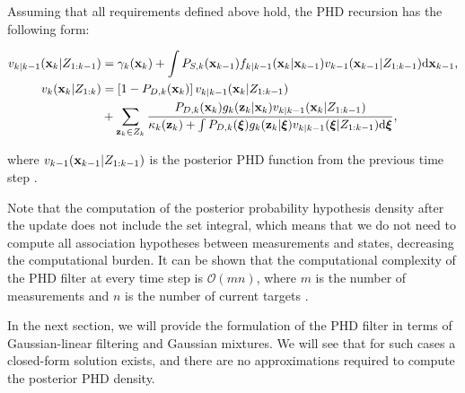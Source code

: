 \begin{theorem}\label{theorem:phd-recursion}
    Assuming that all requirements defined above hold, the PHD recursion has the following form:

    \begin{align}
        v_{k|k-1}(\vecat{x}{k} | Z_{1:k-1})
        &= \gamma_k(\vecat{x}{k}) + \int P_{S,k}(\vecat{x}{k-1}) f_{k|k-1}(\vecat{x}{k} | \vecat{x}{k-1}) v_{k-1}(\vecat{x}{k-1} | Z_{1:k-1}) \mathrm{d} \vecat{x}{k-1}, \\
        v_k(\vecat{x}{k} | Z_{1:k})
        &= \left[1-P_{D,k}(\vecat{x}{k})\right] v_{k|k-1}(\vecat{x}{k} | Z_{1:k-1}) \nonumber \\
        &+ \sum_{\vecat{z}{k} \in Z_k} \frac{
            P_{D,k}(\vecat{x}{k}) g_k(\vecat{z}{k} | \vecat{x}{k}) v_{k|k-1}(\vecat{x}{k} | Z_{1:k-1})
        }{
            \kappa_k(\vecat{z}{k}) + \int P_{D,k}(\boldsymbol{\xi}) g_k(\vecat{z}{k} | \boldsymbol{\xi}) v_{k|k-1}(\boldsymbol{\xi} | Z_{1:k-1}) \mathrm{d} \boldsymbol{\xi}
        },
    \end{align}

    \noindent where $v_{k-1}(\vecat{x}{k-1} | Z_{1:k-1})$ is the posterior PHD function from the previous time step \cite{voGaussianMixtureProbability2006} \cite[588--591]{mahlerStatisticalMultisourcemultitargetInformation2007}.
\end{theorem}

Note that the computation of the posterior probability hypothesis density after the update does not include the set integral, which means that we do not need to compute all association hypotheses between measurements and states, decreasing the computational burden. It can be shown that the computational complexity of the PHD filter at every time step is $\mathcal{O}(mn)$, where $m$ is the number of measurements and $n$ is the number of current targets \cite[592]{mahlerStatisticalMultisourcemultitargetInformation2007}.

In the next section, we will provide the formulation of the PHD filter in terms of Gaussian-linear filtering and Gaussian mixtures. We will see that for such cases a closed-form solution exists, and there are no approximations required to compute the posterior PHD density.
